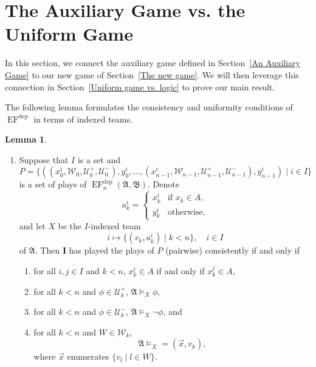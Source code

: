 \documentclass[12pt]{article}
\theoremstyle{definition}
\newtheorem{lemma}[definition]{Lemma}
\newcommand{\playerone}{\mathrm{\mathbf{I}}}
\DeclareMathOperator{\EF}{EF}
\newcommand{\EFdep}{\EF^{\mathrm{dep}}}
\newcommand{\W}{\mathcal W}
\newcommand{\U}{\mathcal U}
\newcommand{\A}{\mathfrak{A}}
\newcommand{\B}{\mathfrak{B}}
\newcommand{\dep}{\mathop{=}}
\begin{document}
\section{The Auxiliary Game vs. the Uniform Game}\label{Auxiliary game vs. uniform game}

In this section, we connect the auxiliary game defined in Section~\ref{An Auxiliary Game} to our new game of Section~\ref{The new game}. We will then leverage this connection in Section~\ref{Uniform game vs. logic} to prove our main result.

The following lemma formulates the consistency and uniformity conditions of $\EFdep$ in terms of indexed teams.

\begin{lemma}\label{lemma: characterisation of the uniform game}\quad
    \begin{enumerate}
        \item Suppose that $I$ is a set and
        \[
            P = \{ ((x_0^i,\W_0,\U^+_0,\U^-_0),y_0^i,\dots,(x_{n-1}^i,\W_{n-1},\U^+_{n-1},\U^-_{n-1}),y_{n-1}^i) \mid i\in I \}
        \]
        is a set of plays of $\EFdep_n(\A,\B)$. Denote
        \[
            a_k^i =
            \begin{cases}
                x_k^i & \text{if $x_k\in A$}, \\
                y_k^i & \text{otherwise},
            \end{cases}
        \]
        and let $X$ be the $I$-indexed team
        \[
            i\mapsto\{(v_k,a^i_k) \mid k<n\}, \quad i\in I
        \]        
        of $\A$. Then $\playerone$ has played the plays of $P$ (pairwise) consistently if and only if
        \begin{enumerate}
            \item for all $i,j\in I$ and $k<n$, $x_k^i\in A$ if and only if $x_k^j\in A$,
            \item for all $k<n$ and $\phi\in\U^+_k$, $\A\models_X\phi$,
            \item for all $k<n$ and $\phi\in\U^-_k$, $\A\models_X\neg\phi$,
            and
            \item for all $k<n$ and $W\in\W_k$,
            \[
                \A\models_X\dep(\vec x, v_k),
            \]
            where $\vec x$ enumerates $\{v_l \mid l\in W\}$.
        \end{enumerate}


\end{enumerate}
\end{lemma}
\end{document}
